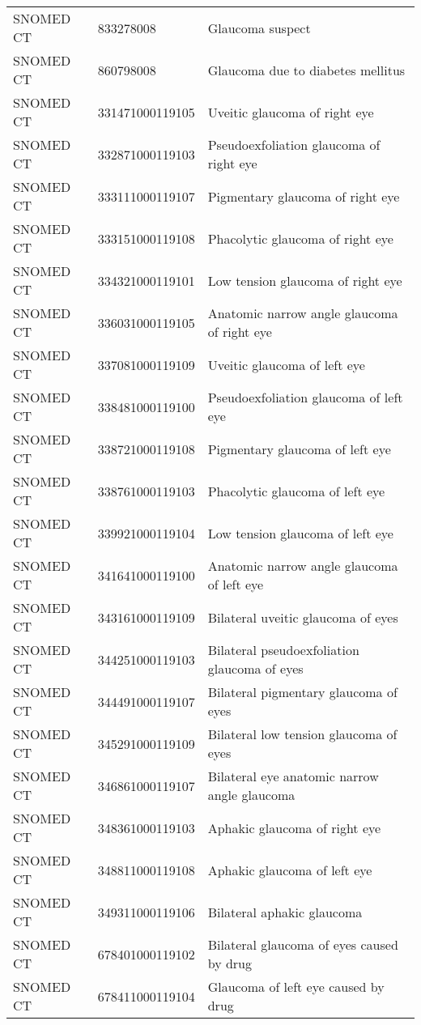 \begin{longtable}{p{}p{}p{}}
  SNOMED CT & 833278008 & Glaucoma suspect \\ 
  SNOMED CT & 860798008 & Glaucoma due to diabetes mellitus \\ 
  SNOMED CT & 331471000119105 & Uveitic glaucoma of right eye \\ 
  SNOMED CT & 332871000119103 & Pseudoexfoliation glaucoma of right eye \\ 
  SNOMED CT & 333111000119107 & Pigmentary glaucoma of right eye \\ 
  SNOMED CT & 333151000119108 & Phacolytic glaucoma of right eye \\ 
  SNOMED CT & 334321000119101 & Low tension glaucoma of right eye \\ 
  SNOMED CT & 336031000119105 & Anatomic narrow angle glaucoma of right eye \\ 
  SNOMED CT & 337081000119109 & Uveitic glaucoma of left eye \\ 
  SNOMED CT & 338481000119100 & Pseudoexfoliation glaucoma of left eye \\ 
  SNOMED CT & 338721000119108 & Pigmentary glaucoma of left eye \\ 
  SNOMED CT & 338761000119103 & Phacolytic glaucoma of left eye \\ 
  SNOMED CT & 339921000119104 & Low tension glaucoma of left eye \\ 
  SNOMED CT & 341641000119100 & Anatomic narrow angle glaucoma of left eye \\ 
  SNOMED CT & 343161000119109 & Bilateral uveitic glaucoma of eyes \\ 
  SNOMED CT & 344251000119103 & Bilateral pseudoexfoliation glaucoma of eyes \\ 
  SNOMED CT & 344491000119107 & Bilateral pigmentary glaucoma of eyes \\ 
  SNOMED CT & 345291000119109 & Bilateral low tension glaucoma of eyes \\ 
  SNOMED CT & 346861000119107 & Bilateral eye anatomic narrow angle glaucoma \\ 
  SNOMED CT & 348361000119103 & Aphakic glaucoma of right eye \\ 
  SNOMED CT & 348811000119108 & Aphakic glaucoma of left eye \\ 
  SNOMED CT & 349311000119106 & Bilateral aphakic glaucoma \\ 
  SNOMED CT & 678401000119102 & Bilateral glaucoma of eyes caused by drug \\ 
  SNOMED CT & 678411000119104 & Glaucoma of left eye caused by drug \\ 

\end{longtable}
